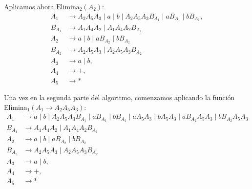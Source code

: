 \documentclass[12pt]{article}
\begin{document}
\begin{ejercicio}[2.5 puntos]
\begin{description}
        Aplicamos ahora $\text{Elimina}_2(A_2)$:
        \begin{align*}
            A_1 &\to A_2 A_5 A_3 \mid  a \mid b\mid A_2 A_5 A_3 B_{A_1} \mid a B_{A_1} \mid b B_{A_1}, \\
            B_{A_1} &\to A_1 A_4 A_2 \mid A_1 A_4 A_2 B_{A_1} \\
            A_2 &\to  a \mid b \mid  a B_{A_2} \mid  b B_{A_2} \\
            B_{A_2} & \to A_2 A_5 A_3 \mid A_2 A_5 A_3 B_{A_2}\\
            A_3 &\to  a \mid b,\\
            A_4 &\to +,\\
            A_5 &\to *
        \end{align*}

        Una vez en la segunda parte del algoritmo, comenzamos aplicando la función $\text{Elimina}_1(A_1\rightarrow A_2 A_5 A_3)$:
        \begin{align*}
            A_1 &\to  a \mid b\mid A_2 A_5 A_3 B_{A_1} \mid a B_{A_1} \mid b B_{A_1}
                \mid  aA_5A_3 \mid bA_5A_3 \mid   a B_{A_2}A_5A_3 \mid  b B_{A_2}A_5A_3 \\
            B_{A_1} &\to A_1 A_4 A_2 \mid A_1 A_4 A_2 B_{A_1} \\
            A_2 &\to  a \mid b \mid   a B_{A_2} \mid  b B_{A_2} \\
            B_{A_2} & \to A_2 A_5 A_3 \mid A_2 A_5 A_3 B_{A_2}\\
            A_3 &\to  a \mid b,\\
            A_4 &\to +,\\
            A_5 &\to *
        \end{align*}


\end{description}
\end{ejercicio}
\end{document}
